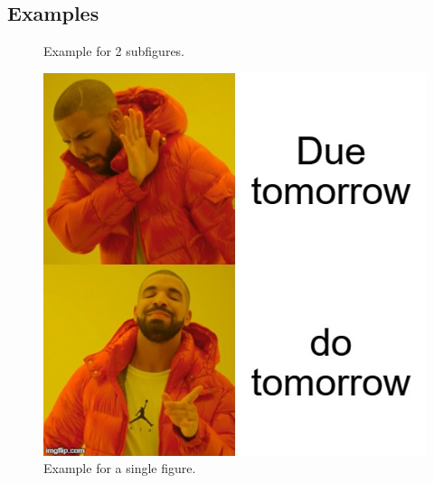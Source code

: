 \documentclass[12pt]{article}
\begin{document}
    \subsection{Examples} \label{sec:Examples}

    \begin{figure}[t]
        \centering
        \caption{Example for 2 subfigures.}
        \label{fig:MemeFormat-Meme}
    \end{figure}



    \begin{figure} [t]
        \centering
        \includegraphics[width=.3\textwidth]{../memes/drake/4.jpg}
        \caption{Example for a single figure.}
        \label{fig:drake}
    \end{figure}
\end{document}
